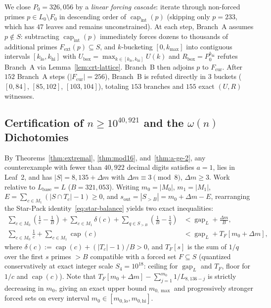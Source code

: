 \documentclass[11pt]{article}
\theoremstyle{remark}
\newcommand{\capf}{\operatorname{cap}}
\newcommand{\gap}{\operatorname{gap}}
\begin{document}
We close $P_0 = 326{,}056$ by a \emph{linear forcing cascade}: iterate through
non-forced primes $p \in L_0 \setminus F_0$ in descending order of
$\capf_{\mathrm{int}}(p)$ (skipping only $p = 233$, which has $47$ leaves and
remains unconstrained). At each step, Branch~A assumes $p \notin S$: subtracting
$\capf_{\mathrm{int}}(p)$ immediately forces dozens to thousands of additional
primes $F_{\mathrm{ext}}(p) \subseteq S$, and $k$-bucketing $[0, k_{\max}]$
into contiguous intervals $[k_{\mathrm{lo}}, k_{\mathrm{hi}}]$ with
$U_{\mathrm{box}} = \max_{k\in [k_{\mathrm{lo}}, k_{\mathrm{hi}}]} U(k)$ and
$R_{\mathrm{box}} = P_0^{k_{\mathrm{hi}}}$ refutes Branch~A via
Lemma~\ref{lem:crt-lattice}. Branch~B then adjoins $p$ to $F_{\mathrm{cur}}$.
After $152$ Branch~A steps ($|F_{\mathrm{cur}}| = 256$), Branch~B is refuted
directly in $3$ buckets ($[0,84]$, $[85,102]$, $[103,104]$), totaling $153$
branches and $155$ exact $(U,R)$ witnesses.

\subsection{Certification of \texorpdfstring{$n \ge 10^{40{,}921}$}{n >= 10\textasciicircum 40921} and the \texorpdfstring{$\omega(n)$}{omega(n)} Dichotomies}
\label{sec:proof-digits}

By Theorems~\ref{thm:extremal}, \ref{thm:mod16}, and~\ref{thm:a-ge-2}, any
counterexample with fewer than $40{,}922$ decimal digits satisfies $a = 1$, lies
in Leaf~2, and has $|S| = 8{,}135 + \Delta m$ with $\Delta m \equiv 3 \pmod 8$,
$\Delta m \ge 3$. Work relative to $L_{\mathrm{base}} = L$ ($B = 321{,}053$).
Writing $m_0 = |M_0|$, $m_1 = |M_1|$, $E = \sum_{c\in M_1}(|S\cap T_c| - 1) \ge 0$,
and $s_{\mathrm{out}} = |S_{>B}| = m_0 + \Delta m - E$, rearranging the
Star-Pack identity~\eqref{eq:star-balance} yields two exact inequalities:
\begin{align}
  \sum_{c\in M_0}\left(\frac{1}{c} - \frac{1}{B}\right)
  + \sum_{c\in M_1} \delta(c)
  + \sum_{q\in S_{>B}}\left(\frac{1}{B} - \frac{1}{q}\right)
  &< \gap_L + \frac{\Delta m}{B},
  \label{eq:delta-budget}\\
  \sum_{c\in M_0}\frac{1}{c} + \sum_{c\in M_1}\capf(c)
  &< \gap_L + T_F[m_0 + \Delta m],
  \label{eq:tail-budget}
\end{align}
where $\delta(c) := \capf(c) + (|T_c| - 1)/B > 0$, and $T_F[s]$ is the sum of
$1/q$ over the first $s$ primes $> B$ compatible with a forced set $F \subseteq S$
(quantized conservatively at exact integer scale $S_4 = 10^{18}$: ceiling for
$\gap_L$ and $T_F$, floor for $1/c$ and $\capf(c)$). Note that
$T_F[m_0 + \Delta m] - \sum_{j=1}^{m_0} 1/L_{8{,}136-j}$ is strictly decreasing
in $m_0$, giving an exact upper bound $m_{0,\max}$ and progressively stronger
forced sets on every interval $m_0 \in [m_{0,\mathrm{lo}}, m_{0,\mathrm{hi}}]$.
\end{document}

